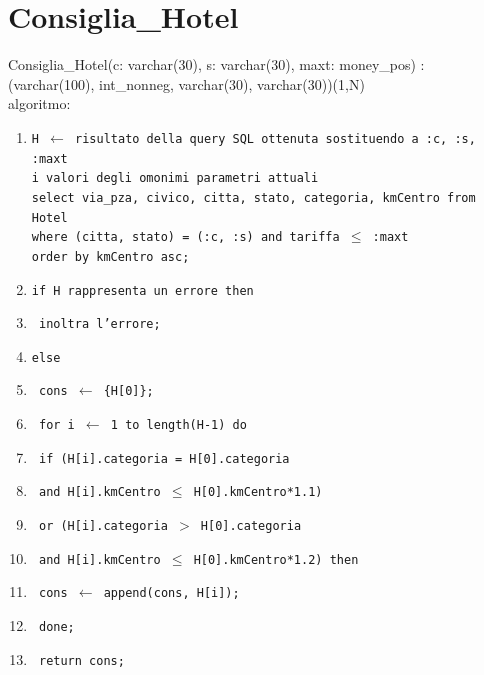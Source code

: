\documentclass[a4paper,12pt]{report}
\begin{document}
      \section{Consiglia\_Hotel}
        Consiglia\_Hotel(c: varchar(30), s: varchar(30), maxt: money\_pos) : \\
        \hspace*{2cm}(varchar(100), int\_nonneg, varchar(30), varchar(30))(1,N) \\
        \hspace*{1cm}algoritmo: \\
        \begin{enumerate}[label*=\arabic*]
          \item \texttt{H $\leftarrow$ risultato della query SQL ottenuta sostituendo a :c, :s, :maxt \\
            \hspace*{1cm} i valori degli omonimi parametri attuali \\
            \hspace*{1cm} select via\_pza, civico, citta, stato, categoria, kmCentro from Hotel \\
            \hspace*{1cm} where (citta, stato) = (:c, :s) and tariffa $\leq$ :maxt \\
            \hspace*{1cm} order by kmCentro asc;}
          \item \texttt{if H rappresenta un errore then}
          \item \texttt{\hspace*{1cm} inoltra l'errore;}
          \item \texttt{else}
          \item \texttt{\hspace*{1cm} cons $\leftarrow$ \{H[0]\};}
          \item \texttt{\hspace*{1cm} for i $\leftarrow$ 1 to length(H-1) do}
          \item \texttt{\hspace*{2cm} if (H[i].categoria = H[0].categoria}
          \item \texttt{\hspace*{4cm} and H[i].kmCentro $\leq$ H[0].kmCentro*1.1)}
          \item \texttt{\hspace*{4cm} or (H[i].categoria $>$ H[0].categoria}
          \item \texttt{\hspace*{4cm} and H[i].kmCentro $\leq$ H[0].kmCentro*1.2) then}
          \item \texttt{\hspace*{3cm} cons $\leftarrow$ append(cons, H[i]);}
          \item \texttt{\hspace*{1cm} done;}
          \item \texttt{\hspace*{1cm} return cons;}
        \end{enumerate}
\end{document}
